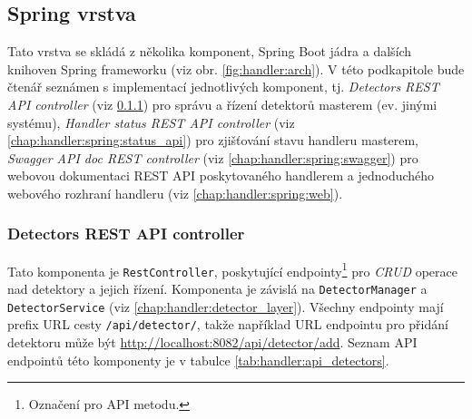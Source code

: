 \subsection{Spring vrstva}\label{chap:handler:spring}
Tato vrstva se skládá z několika komponent, Spring Boot jádra a dalších knihoven Spring frameworku (viz obr. \ref{fig:handler:arch}). V této podkapitole bude čtenář seznámen s implementací jednotlivých komponent, tj. \textit{Detectors REST API controller} (viz \ref{chap:handler:spring:detectors_api}) pro správu a řízení detektorů masterem (ev. jinými systému), \textit{Handler status REST API controller} (viz \ref{chap:handler:spring:status_api}) pro zjišťování stavu handleru masterem, \textit{Swagger API doc REST controller} (viz \ref{chap:handler:spring:swagger}) pro webovou dokumentaci REST API poskytovaného handlerem a jednoduchého webového rozhraní handleru (viz \ref{chap:handler:spring:web}).

\subsubsection{Detectors REST API controller}\label{chap:handler:spring:detectors_api}
Tato komponenta je \texttt{RestController}, poskytující endpointy\footnote{Označení pro API metodu.} pro \textit{CRUD} operace nad detektory a jejich řízení. Komponenta je závislá na \texttt{DetectorManager} a \texttt{DetectorService} (viz \ref{chap:handler:detector_layer}). Všechny endpointy mají prefix URL cesty \texttt{/api/detector/}, takže například URL endpointu pro přidání detektoru může být \url{http://localhost:8082/api/detector/add}. Seznam API endpointů této komponenty je v tabulce \ref{tab:handler:api_detectors}.

